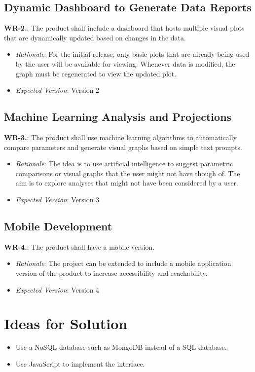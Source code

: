 \documentclass[12pt]{article}
\begin{document}
\subsection{Dynamic Dashboard to Generate Data Reports}
\textbf{WR-2.}: The product shall include a dashboard that hosts multiple visual plots that are dynamically updated based on changes in the data.
\begin{itemize}
  \item \emph{Rationale}: For the initial release, only basic plots that are already being used by the user will be available for viewing. Whenever data is modified, the graph
  must be regenerated to view the updated plot.
  \item \emph{Expected Version}: Version 2
\end{itemize}

\subsection{Machine Learning Analysis and Projections}
\textbf{WR-3.}: The product shall use machine learning algorithms to automatically compare parameters and generate visual graphs based on simple text prompts.
\begin{itemize}
  \item \emph{Rationale}: The idea is to use artificial intelligence to suggest parametric comparisons or visual graphs that the user might not have though of. The aim is to
  explore analyses that might not have been considered by a user.
  \item \emph{Expected Version}: Version 3
\end{itemize}

\subsection{Mobile Development}
\textbf{WR-4.}: The product shall have a mobile version.
\begin{itemize}
  \item \emph{Rationale}: The project can be extended to include a mobile application version of the product to increase accessibility and reachability.
  \item \emph{Expected Version}: Version 4
\end{itemize}

\section{Ideas for Solution}
\begin{itemize}
  \item Use a NoSQL database such as MongoDB instead of a SQL database.
  \item Use JavaScript to implement the interface. 
\end{itemize}
\end{document}
